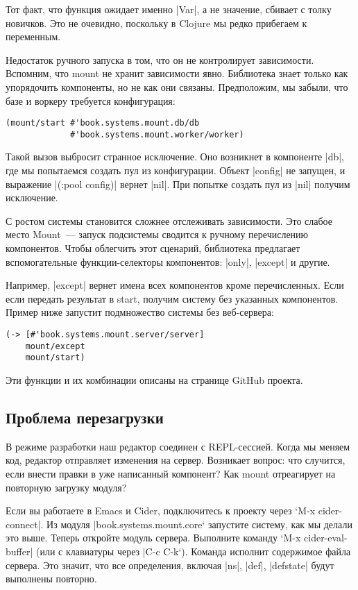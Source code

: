 Тот факт, что функция ожидает именно \spverb|Var|, а не значение, сбивает с толку
новичков. Это не очевидно, поскольку в Clojure мы редко прибегаем к переменным.

Недостаток ручного запуска в том, что он не контролирует зависимости. Вспомним,
что mount не хранит зависимости явно. Библиотека знает только как упорядочить
компоненты, но не как они связаны. Предположим, мы забыли, что базе и воркеру
требуется конфигурация:

\begin{verbatim}
(mount/start #'book.systems.mount.db/db
             #'book.systems.mount.worker/worker)
\end{verbatim}

Такой вызов выбросит странное исключение. Оно возникнет в компоненте \spverb|db|, где
мы попытаемся создать пул из конфигурации. Объект \spverb|config| не запущен, и
выражение \spverb|(:pool config)| вернет \spverb|nil|. При попытке создать пул из \spverb|nil|
получим исключение.

С ростом системы становится сложнее отслеживать зависимости. Это слабое место
Mount~--- запуск подсистемы сводится к ручному перечислению компонентов. Чтобы
облегчить этот сценарий, библиотека предлагает вспомогательные функции-селекторы
компонентов: \spverb|only|, \spverb|except| и другие.

Например, \spverb|except| вернет имена всех компонентов кроме перечисленных. Если если
передать результат в start, получим систему без указанных компонентов. Пример
ниже запустит подмножество системы без веб-сервера:

\begin{verbatim}
(-> [#'book.systems.mount.server/server]
    mount/except
    mount/start)
\end{verbatim}

Эти функции и их комбинации описаны на странице GitHub проекта.

\subsection{Проблема перезагрузки}

В режиме разработки наш редактор соединен с REPL-сессией. Когда мы меняем код,
редактор отправляет изменения на сервер. Возникает вопрос: что случится, если
внести правки в уже написанный компонент? Как mount отреагирует на повторную
загрузку модуля?

Если вы работаете в Emacs и Cider, подключитесь к проекту через `M-x
cider-connect\spverb|. Из модуля |book.systems.mount.core` запустите систему, как мы
делали это выше. Теперь откройте модуль сервера. Выполните команду `M-x
cider-eval-buffer\spverb| (или с клавиатуры через |C-c C-k`). Команда исполнит
содержимое файла сервера. Это значит, что все определения, включая \spverb|ns|, \spverb|def|,
\spverb|defstate| будут выполнены повторно.

